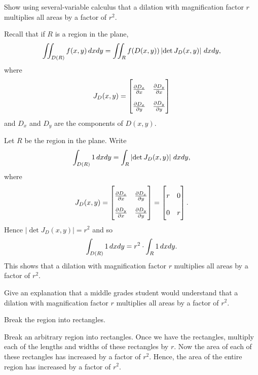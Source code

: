 \documentclass[newpage,hints,handout]{ximera}
\begin{document}
\begin{problem}
Show using several-variable calculus that a dilation with
magnification factor $r$ multiplies all areas by a factor of $r^{2}$.
\begin{hint}
Recall that if $R$ is a region in the plane, 
\[
\iint_{D(R)} f(x,y)  \,d xdy = \iint_{R} f(D(x,y)) \left|\det J_D(x,y)\right| \,d xdy,
\]
where
\[
J_D(x,y) =
{\renewcommand\arraystretch{2}
\begin{bmatrix}
\pp[D_x]{x} & \pp[D_y]{x} \\
\pp[D_x]{y} & \pp[D_y]{y}
\end{bmatrix}}
\]
and $D_x$ and $D_y$ are the components of $D(x,y)$.
\end{hint}
\begin{freeResponse}
Let $R$ be the region in the plane. Write
\[
\int_{D(R)} 1  \,d xdy = \int_{R}  \left|\det J_D(x,y)\right| \,d xdy,
\]
where
\[
J_D(x,y) =
{\renewcommand\arraystretch{2}
\begin{bmatrix}
\pp[D_x]{x} & \pp[D_x]{y} \\
\pp[D_y]{x} & \pp[D_y]{y}
\end{bmatrix}} = 
\begin{bmatrix}
r & 0 \\
0 & r
\end{bmatrix}.
\]
Hence $\left|\det J_D(x,y)\right| = r^2$ and so 
\[
\int_{D(R)} 1  \,d xdy = r^2\cdot \int_R 1\,d xdy.
\]
This shows that a dilation with magnification factor $r$ multiplies
all areas by a factor of $r^{2}$.
\end{freeResponse}
\end{problem}

\begin{problem}
Give an explanation that a middle grades student would understand that
a dilation with magnification factor $r$ multiplies all areas by a
factor of $r^{2}$.
\begin{hint}
Break the region into rectangles. 
\end{hint}
\begin{freeResponse}
Break an arbitrary region into rectangles. Once we have the
rectangles, multiply each of the lengths and widths of these
rectangles by $r$. Now the area of each of these rectangles has
increased by a factor of $r^2$. Hence, the area of the entire region
has increased by a factor of $r^2$.
\end{freeResponse}
\end{problem}
\end{document}

